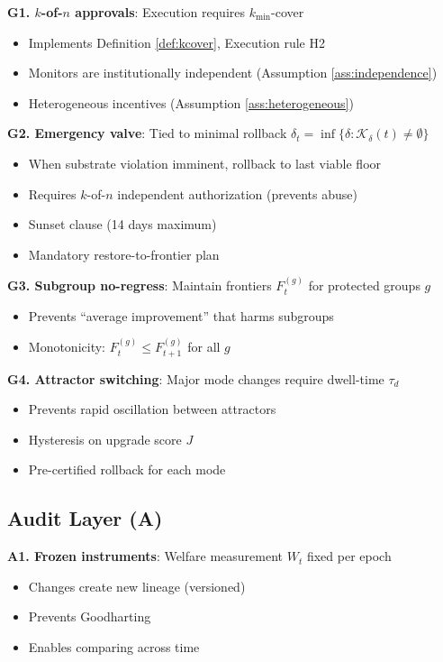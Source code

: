 \documentclass[11pt,a4paper]{article}
\theoremstyle{definition}
\newcommand{\K}{\mathcal{K}}
\begin{document}
\textbf{G1. $k$-of-$n$ approvals}: Execution requires $k_{\min}$-cover
\begin{itemize}
\item Implements Definition \ref{def:kcover}, Execution rule H2
\item Monitors are institutionally independent (Assumption \ref{ass:independence})
\item Heterogeneous incentives (Assumption \ref{ass:heterogeneous})
\end{itemize}

\textbf{G2. Emergency valve}: Tied to minimal rollback $\delta_t = \inf\{\delta : \K_\delta(t) \neq \emptyset\}$
\begin{itemize}
\item When substrate violation imminent, rollback to last viable floor
\item Requires $k$-of-$n$ independent authorization (prevents abuse)
\item Sunset clause (14 days maximum)
\item Mandatory restore-to-frontier plan
\end{itemize}

\textbf{G3. Subgroup no-regress}: Maintain frontiers $F_t^{(g)}$ for protected groups $g$
\begin{itemize}
\item Prevents ``average improvement'' that harms subgroups
\item Monotonicity: $F_t^{(g)} \leq F_{t+1}^{(g)}$ for all $g$
\end{itemize}

\textbf{G4. Attractor switching}: Major mode changes require dwell-time $\tau_d$
\begin{itemize}
\item Prevents rapid oscillation between attractors
\item Hysteresis on upgrade score $J$
\item Pre-certified rollback for each mode
\end{itemize}

\subsection{Audit Layer (A)}

\textbf{A1. Frozen instruments}: Welfare measurement $W_t$ fixed per epoch
\begin{itemize}
\item Changes create new lineage (versioned)
\item Prevents Goodharting
\item Enables comparing across time
\end{itemize}
\end{document}
